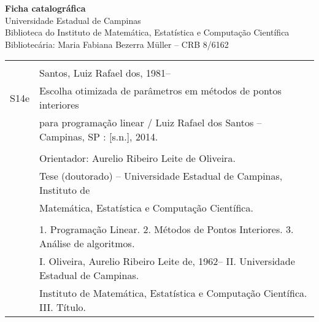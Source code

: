 \thispagestyle{plain}


\begin{center}
   \textbf{Ficha catalográfica} \\
   Universidade Estadual de Campinas \\
   Biblioteca do Instituto de Matemática, Estatística e Computação Científica\\
Bibliotec\'aria: Maria Fabiana Bezerra M\"uller -- CRB 8/6162 \\[1cm]
\end{center}

\begin{center}

\begin{tabular}{|cl|} \hline
  \hspace{1.3cm} & \\
  & Santos, Luiz Rafael dos, 1981--  \\
  \hspace{0.2cm} S14e & \hspace{0.6cm} Escolha otimizada de parâmetros em métodos de pontos interiores  \\ 
  &   para programação linear / Luiz Rafael dos Santos --
  Campinas, SP  : [s.n.], 2014. \\
  & \\
  & \hspace{0.6cm} Orientador: Aurelio Ribeiro Leite de Oliveira.\\
  & \hspace{0.6cm} Tese (doutorado) -- 
Universidade Estadual de Campinas, Instituto de  \\
  & Matem\'atica, Estat\'istica e Computa\c{c}\~ao   Cient\'ifica.\\ 
  & \\
  & \hspace{0.6cm} 1. Programação Linear. 2. Métodos de Pontos Interiores.  
  3. Análise de algoritmos.  \\ 
  & I. Oliveira, Aurelio Ribeiro Leite de, 1962--   \hspace{0.1cm} II. Universidade Estadual de
Campinas. 
  \\
  & Instituto de Matem\'atica,  Estat\'istica e Computa\c{c}\~ao Cient\'ifica.   III. T\'itulo. \\[0.5cm]
  \hline
\end{tabular}
\end{center}

